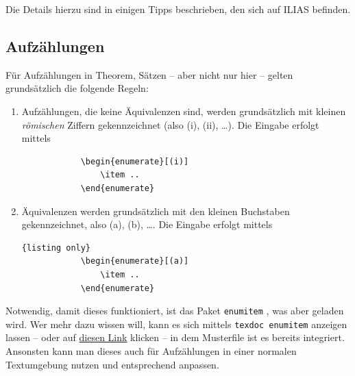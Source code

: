 Die Details hierzu sind in einigen Tipps beschrieben, den sich auf ILIAS befinden.

\subsection{Aufzählungen}
Für Aufzählungen in Theorem, Sätzen \etc -- aber nicht nur hier --  gelten grundsätzlich die folgende Regeln:
%
\begin{enumerate}[(1)]
	\item 
	Aufzählungen, die keine Äquivalenzen sind, werden grundsätzlich mit kleinen \emph{römischen} Ziffern gekennzeichnet (also (i), (ii), \dots).
Die Eingabe erfolgt mittels
%
	\begin{center}
		\begin{lstlisting}
 			\begin{enumerate}[(i)]
				\item ..
			\end{enumerate}
		\end{lstlisting}
 	\end{center}
	
	\item
	Äquivalenzen  werden grundsätzlich mit den kleinen Buchstaben gekennzeichnet, also (a), (b), \dots .
	Die Eingabe erfolgt mittels	
	\begin{center}
		\begin{lstlisting}{listing only}
			\begin{enumerate}[(a)]
				\item ..
			\end{enumerate}
		\end{lstlisting}
	\end{center}
	
%	
% 			
			
\end{enumerate}
%
Notwendig, damit dieses funktioniert, ist das Paket \texttt{enumitem} \cite{enumitem}, was aber geladen wird.
Wer mehr dazu wissen will, kann es sich mittels \verb!texdoc enumitem! anzeigen lassen -- oder auf \href{https://ctan.org/pkg/enumitem}{diesen Link} klicken -- in dem Musterfile ist es bereits integriert.
Ansonsten kann man dieses auch für Aufzählungen in einer normalen Textumgebung nutzen und entsprechend anpassen.
